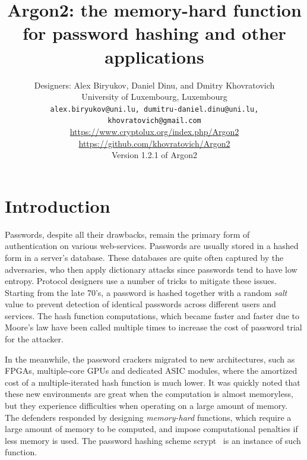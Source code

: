 \documentclass[a4paper]{article}
\begin{document}

\title{\textsf{Argon2: the memory-hard function for password hashing and other applications}}

\author{Designers: Alex Biryukov, Daniel Dinu,  and Dmitry Khovratovich\\University of Luxembourg, Luxembourg
\\[10pt]
{\tt alex.biryukov@uni.lu, dumitru-daniel.dinu@uni.lu, khovratovich@gmail.com}\\[10 pt]
\url{https://www.cryptolux.org/index.php/Argon2}\\
\url{https://github.com/khovratovich/Argon2}\\[10pt]
Version 1.2.1 of Argon2}

\maketitle

\section{Introduction}

Passwords, despite all their drawbacks, remain the primary form of authentication on various web-services. Passwords are usually stored in a hashed form in a server's database. These databases are quite often captured by the adversaries,  who then apply dictionary attacks since passwords tend to have low entropy. Protocol designers use a number of tricks to mitigate these issues. Starting from the late 70's, a password is hashed together with a random \emph{salt} value to prevent detection of identical passwords across different users and services. The hash function computations, which became faster and faster due to Moore's law have been called multiple times to increase the cost of password trial for the attacker.

 In the meanwhile, the password crackers migrated to new architectures, such as FPGAs, multiple-core GPUs and dedicated ASIC modules, where the amortized cost of a multiple-iterated hash function is much lower. It was quickly noted that these new environments are great when the computation is almost memoryless, but they experience difficulties when  operating on a large amount of memory. The defenders responded by designing \emph{memory-hard} functions, which require a large amount of memory to be computed, and impose computational penalties if less memory is used. The password hashing scheme \textsf{scrypt}~\cite{percival2009stronger} is an instance of such function.
\end{document}
